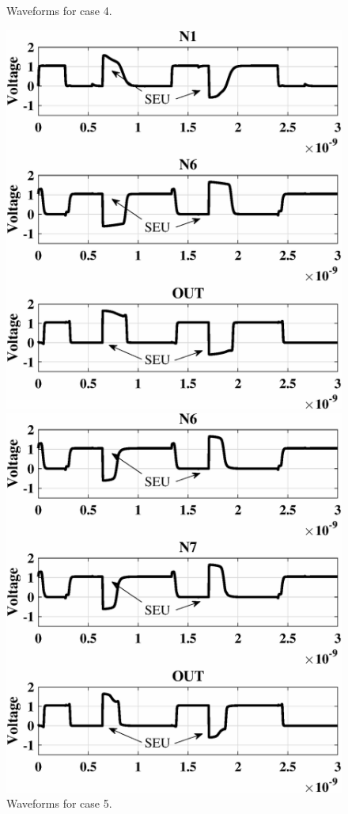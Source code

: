 \begin{figure}[!htbp]
\begin{minipage}{4cm}
		\caption{Waveforms for case 4.}
		\label{fig:case4}
	\end{minipage}
\end{figure}

\begin{figure}[!htbp]
	\centering
	\parbox{4cm}{
		\includegraphics[width=\linewidth]{Figures/TNUPlots/case5.eps}
		\caption{Waveforms for case 5.}
		\label{fig:case5}}
	\qquad
	\begin{minipage}{4cm}
		\includegraphics[width=\linewidth]{Figures/TNUPlots/case6.eps}

\end{minipage}
\end{figure}

